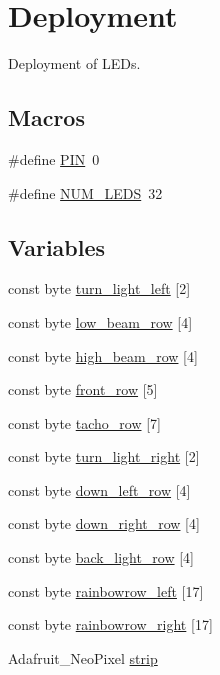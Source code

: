 \hypertarget{group__deployment}{}\section{Deployment}
\label{group__deployment}


Deployment of L\+E\+Ds.  


\subsection*{Macros}
\begin{DoxyCompactItemize}
\item 
\#define \hyperlink{group__deployment_gae1a27401b7fb01ccb9a82dbddbb54eea}{P\+IN}~0
\item 
\#define \hyperlink{group__deployment_ga4c4ae9a4146ce8d6a5debc90300d9abd}{N\+U\+M\+\_\+\+L\+E\+DS}~32
\end{DoxyCompactItemize}
\subsection*{Variables}
\begin{DoxyCompactItemize}
\item 
const byte \hyperlink{group__deployment_gaa66783b35924c2be3ec318934f0d479f}{turn\+\_\+light\+\_\+left} \mbox{[}2\mbox{]}
\item 
const byte \hyperlink{group__deployment_ga89eb753b2bc73cbce90666cfe4331634}{low\+\_\+beam\+\_\+row} \mbox{[}4\mbox{]}
\item 
const byte \hyperlink{group__deployment_ga8b165874b487053cb404215a7f42e33e}{high\+\_\+beam\+\_\+row} \mbox{[}4\mbox{]}
\item 
const byte \hyperlink{group__deployment_ga848556a6e145736d917b4f0a67ee60ae}{front\+\_\+row} \mbox{[}5\mbox{]}
\item 
const byte \hyperlink{group__deployment_gae646a1734cc95ba36b0998697da68878}{tacho\+\_\+row} \mbox{[}7\mbox{]}
\item 
const byte \hyperlink{group__deployment_ga2c04f83f019c3bf8feeaae688dbbc164}{turn\+\_\+light\+\_\+right} \mbox{[}2\mbox{]}
\item 
const byte \hyperlink{group__deployment_gac8900a0d9fa4f35f99c82be1db05199d}{down\+\_\+left\+\_\+row} \mbox{[}4\mbox{]}
\item 
const byte \hyperlink{group__deployment_gac32ac62cf68805d76bf34bdd3c83fb0c}{down\+\_\+right\+\_\+row} \mbox{[}4\mbox{]}
\item 
const byte \hyperlink{group__deployment_ga3a2101866267bf0af2559a241cdb7cc6}{back\+\_\+light\+\_\+row} \mbox{[}4\mbox{]}
\item 
const byte \hyperlink{group__deployment_ga61c28c043183f54a51db2a5175940b86}{rainbowrow\+\_\+left} \mbox{[}17\mbox{]}
\item 
const byte \hyperlink{group__deployment_gaa16b875157c2f58794ae5136b851c078}{rainbowrow\+\_\+right} \mbox{[}17\mbox{]}
\item 
Adafruit\+\_\+\+Neo\+Pixel \hyperlink{group__deployment_gacf2771bd8bfaf855bbcc6c30301bf380}{strip}
\end{DoxyCompactItemize}


